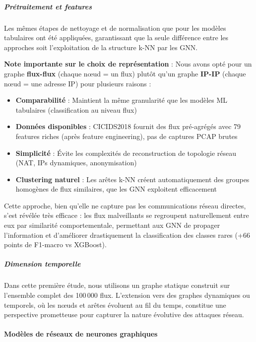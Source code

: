 ﻿\documentclass[11pt,a4paper]{article}
\begin{document}
\subparagraph{Prétraitement et features}

Les mêmes étapes de nettoyage et de normalisation que pour les modèles tabulaires ont été appliquées, garantissant que la seule différence entre les approches soit l'exploitation de la structure k-NN par les GNN.

\textbf{Note importante sur le choix de représentation} : Nous avons opté pour un graphe \textbf{flux-flux} (chaque nœud = un flux) plutôt qu'un graphe \textbf{IP-IP} (chaque nœud = une adresse IP) pour plusieurs raisons :
\begin{itemize}
    \item \textbf{Comparabilité} : Maintient la même granularité que les modèles ML tabulaires (classification au niveau flux)
    \item \textbf{Données disponibles} : CICIDS2018 fournit des flux pré-agrégés avec 79 features riches (après feature engineering), pas de captures PCAP brutes
    \item \textbf{Simplicité} : Évite les complexités de reconstruction de topologie réseau (NAT, IPs dynamiques, anonymisation)
    \item \textbf{Clustering naturel} : Les arêtes k-NN créent automatiquement des groupes homogènes de flux similaires, que les GNN exploitent efficacement
\end{itemize}

Cette approche, bien qu'elle ne capture pas les communications réseau directes, s'est révélée très efficace : les flux malveillants se regroupent naturellement entre eux par similarité comportementale, permettant aux GNN de propager l'information et d'améliorer drastiquement la classification des classes rares (+66 points de F1-macro vs XGBoost).

\subparagraph{Dimension temporelle}

Dans cette première étude, nous utilisons un graphe statique construit sur l'ensemble complet des 100\,000 flux. L'extension vers des graphes dynamiques ou temporels, où les nœuds et arêtes évoluent au fil du temps, constitue une perspective prometteuse pour capturer la nature évolutive des attaques réseau.

\paragraph{Modèles de réseaux de neurones graphiques}
\end{document}
